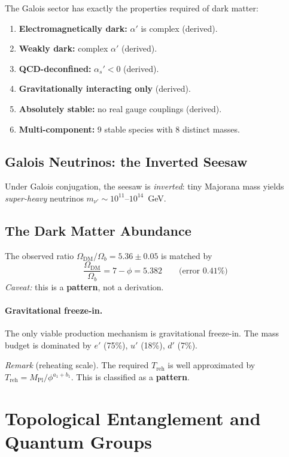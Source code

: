 \documentclass[12pt,a4paper]{article}
\theoremstyle{definition}
\begin{document}
The Galois sector has exactly the properties required of dark matter:
\begin{enumerate}
\item \textbf{Electromagnetically dark:} $\alpha'$ is complex (derived).
\item \textbf{Weakly dark:} complex $\alpha'$ (derived).
\item \textbf{QCD-deconfined:} $\alpha_s' < 0$ (derived).
\item \textbf{Gravitationally interacting only} (derived).
\item \textbf{Absolutely stable:} no real gauge couplings (derived).
\item \textbf{Multi-component:} 9 stable species with 8 distinct masses.
\end{enumerate}

\subsection{Galois Neutrinos: the Inverted Seesaw}

Under Galois conjugation, the seesaw is \emph{inverted}: tiny Majorana mass yields \emph{super-heavy} neutrinos $m_{\nu'} \sim 10^{11}\text{--}10^{14}$~GeV.

\subsection{The Dark Matter Abundance}

The observed ratio $\Omega_{\text{DM}} / \Omega_b = 5.36 \pm 0.05$ is matched by
\begin{equation}
\frac{\Omega_{\text{DM}}}{\Omega_b} = 7 - \phi = 5.382 \qquad \text{(error 0.41\%)}
\end{equation}
\textit{Caveat:} this is a \textbf{pattern}, not a derivation.

\paragraph{Gravitational freeze-in.}
The only viable production mechanism is gravitational freeze-in.  The mass budget is dominated by $e'$ (75\%), $u'$ (18\%), $d'$ (7\%).

\textit{Remark} (reheating scale).  The required $T_{\text{reh}}$ is well approximated by $T_{\text{reh}} = M_{\text{Pl}}/\phi^{a_1 + b_1}$.  This is classified as a \textbf{pattern}.


\section{Topological Entanglement and Quantum Groups}
\label{sec:S-tqft}
\end{document}
